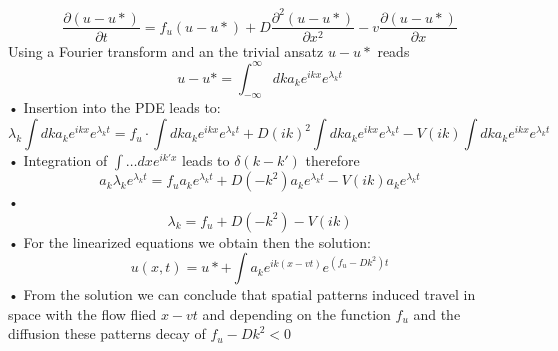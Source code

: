 \documentclass[hyperref]{labbook}
\numberwithin{equation}{experiment}
\numberwithin{table}{experiment}
\numberwithin{figure}{experiment}
\begin{document}
\begin{equation}
\frac{\partial (u-u*)}{\partial t} = f_u(u-u*) + D\frac{\partial^2 (u-u*)}{\partial x^2} - v   \frac{\partial (u-u*)}{\partial x}
\end{equation}
Using a Fourier transform and an the trivial ansatz $u-u*$ reads
\begin{equation}
u-u* = \int_{-\infty}^{\infty} dk a_k e^{ikx} e^{\lambda_k t}
\end{equation}•
Insertion into the PDE leads to:
\begin{equation}
\lambda_k \int dk a_k e^{ikx} e^{\lambda_k t} = f_u \cdot \int dk a_k e^{ikx} e^{\lambda_k t}  + D(ik)^2\int dk a_k e^{ikx} e^{\lambda_k t} - V(ik)\int dk a_k e^{ikx} e^{\lambda_k t} 
\end{equation}•
Integration of $\int\dots dx  e^{ik'x}$  leads to $\delta(k-k')$ therefore 
\begin{equation}
a_k \lambda_k e^{\lambda_kt} = f_u a_k e^{\lambda_kt} + D(-k^2)a_k e^{\lambda_kt} - V(ik)a_k  e^{\lambda_kt} 
\end{equation}•
\begin{equation}
\lambda_k  = f_u  + D(-k^2) - V(ik)
\end{equation}•
For the linearized equations we obtain then the solution: 
\begin{equation}
u(x,t) = u* + \int a_k e^{ik(x-vt)}e^{(f_u-Dk^2)t}
\end{equation}•
From the solution we can conclude that spatial patterns induced travel in space with the flow flied $x-vt$ and depending on the function $f_u$ and the diffusion these patterns decay of $f_u -Dk^2 < 0$ 
\end{document}
